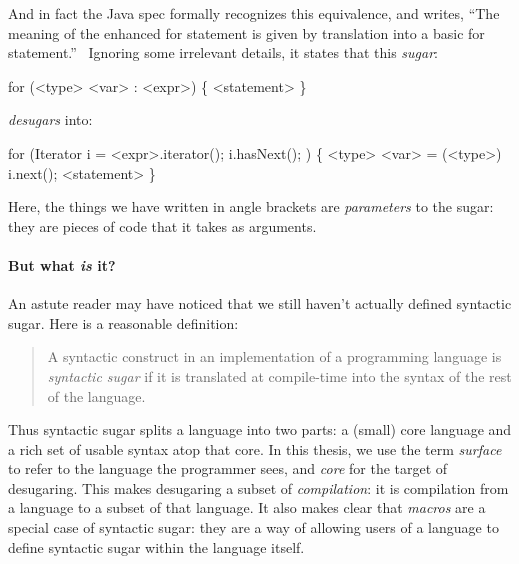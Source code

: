 And in fact the Java spec formally recognizes this equivalence, and
writes, ``The meaning of the enhanced for statement is given by
translation into a basic for statement.''~\cite[section 14.14.2]{java8} Ignoring some
irrelevant details, it states that this \emph{sugar}:
\begin{Codes}
for (<type> <var> : <expr>) \{ <statement> \}
\end{Codes}
\emph{desugars} into:
\begin{Codes}
for (Iterator i = <expr>.iterator(); i.hasNext(); ) \{
  <type> <var> = (<type>) i.next();
  <statement>
\}
\end{Codes}
Here, the things we have written in angle brackets are
\emph{parameters} to the sugar: they are pieces of code that it
takes as arguments.


\paragraph{But what \emph{is} it?}
An astute reader may have noticed that we still haven't actually
defined syntactic sugar. Here is a reasonable definition:
\begin{quote}
  A syntactic construct in an implementation of a programming language
  is \emph{syntactic sugar} if it is translated at compile-time into
  the syntax of the rest of the language.
\end{quote}
Thus syntactic sugar splits a language into two parts: a (small) core
language and a rich set of usable syntax atop that core. In this
thesis, we use the term \emph{surface} to refer to the language the
programmer sees, and \emph{core} for the target of desugaring.
This makes desugaring a subset of \emph{compilation}: it is
compilation from a language to a subset of that language. It also
makes clear that \emph{macros} are a special case of syntactic sugar:
they are a way of allowing users of a language to
define syntactic sugar within the language itself.


